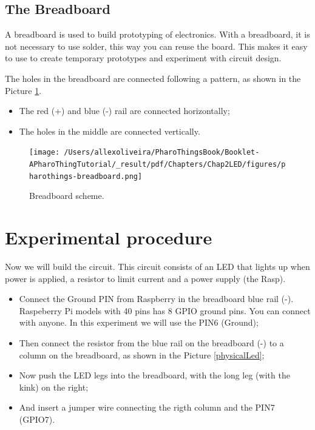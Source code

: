 \documentclass[10pt,twoside,english]{_support/latex/sbabook/sbabook}
\begin{document}
\subsection{The Breadboard}
A breadboard is used to build prototyping of electronics. With a breadboard, it is not necessary to use solder, this way you can reuse the board. This makes it easy to use to create temporary prototypes and experiment with circuit design.

The holes in the breadboard are connected following a pattern, as shown in the Picture \ref{Breadboard}.

\begin{itemize}
\item The red (+) and blue (-) rail are connected horizontally;
\item The holes in the middle are connected vertically.
\end{itemize}


\begin{figure}

\begin{center}
\texttt{[image: /Users/allexoliveira/PharoThingsBook/Booklet-APharoThingTutorial/\_result/pdf/Chapters/Chap2LED/figures/pharothings-breadboard.png]}\caption{Breadboard scheme.\label{Breadboard}}\end{center}
\end{figure}

\section{Experimental procedure}
Now we will build the circuit. This circuit consists of an LED that lights up when power is applied, a resistor to limit current and a power supply (the Rasp).

\begin{itemize}
\item Connect the Ground PIN from Raspberry in the breadboard blue rail (-). Raspeberry Pi models with 40 pins has 8 GPIO ground pins. You can connect with anyone. In this experiment we will use the PIN6 (Ground);
\item Then connect the resistor from the blue rail on the breadboard (-) to a column on the breadboard, as shown in the Picture \ref{physicalLed};
\item Now push the LED legs into the breadboard, with the long leg (with the kink) on the right;
\item And insert a jumper wire connecting the rigth column and the PIN7 (GPIO7).
\end{itemize}
\end{document}
